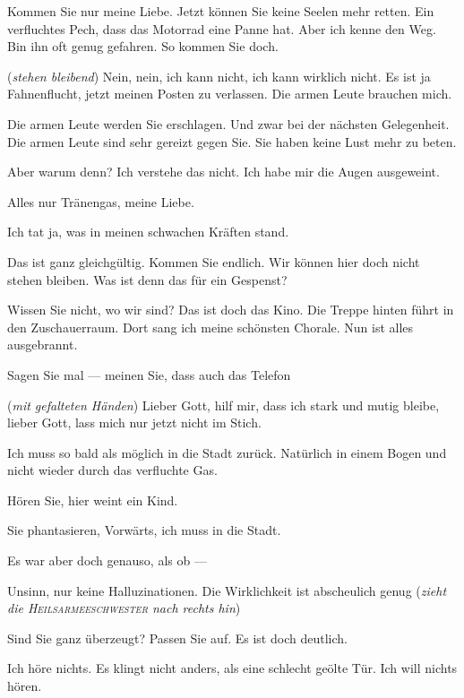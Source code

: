 \documentclass[
	final,
	a4paper,
	ngerman,
	mpinclude = true, %
	twoside = true,
	open = right,
	cleardoublepage = plain,
	DIV = 13,
	BCOR = 1cm,
	titlepage = firstiscover,
	]{scrbook}
\newcommand{\direction}[1]{(\textit{#1})}
\newcommand{\thecharacter}[1]{\textup{\textsc{#1}}\xspace}
\newcommand{\theSalwin}{\thecharacter{Salwin}}
\newcommand{\theHeilsarmeeschwester}{\thecharacter{Heilsarmeeschwester}}
\newcommand{\character}[1]{\item[#1]}
\newcommand{\Salwin}{\character{\theSalwin}}
\newcommand{\Heilsarmeeschwester}{\character{Schwester}}
\begin{document}
\begin{play}

\Salwin
Kommen Sie nur meine Liebe. Jetzt können Sie keine Seelen mehr retten. Ein verfluchtes Pech, dass das Motorrad eine Panne hat. Aber ich kenne den Weg. Bin ihn oft genug gefahren. So kommen Sie doch.

\Heilsarmeeschwester
\direction{stehen bleibend} Nein, nein, ich kann nicht, ich kann wirklich nicht. Es ist ja Fahnenflucht, jetzt meinen Posten zu verlassen. Die armen Leute brauchen mich.

\Salwin
Die armen Leute werden Sie erschlagen. Und zwar bei der nächsten Gelegenheit. Die armen Leute sind sehr gereizt gegen Sie. Sie haben keine Lust mehr zu beten.

\Heilsarmeeschwester
Aber warum denn? Ich verstehe das nicht. Ich habe mir die Augen ausgeweint.

\Salwin
Alles nur Tränengas, meine Liebe.

\Heilsarmeeschwester
Ich tat ja, was in meinen schwachen Kräften stand.

\Salwin
Das ist ganz gleichgültig. Kommen Sie endlich. Wir können hier doch nicht stehen bleiben. Was ist denn das für ein Gespenst?

\Heilsarmeeschwester
Wissen Sie nicht, wo wir sind? Das ist doch das Kino. Die Treppe hinten führt in den Zuschauerraum. Dort sang ich meine schönsten Chorale. Nun ist alles ausgebrannt.

\Salwin
Sagen Sie mal --- meinen Sie, dass auch das Telefon

\Heilsarmeeschwester
\direction{mit gefalteten Händen} Lieber Gott, hilf mir, dass ich stark und mutig bleibe, lieber Gott, lass mich nur jetzt nicht im Stich.

\Salwin
Ich muss so bald als möglich in die Stadt zurück. Natürlich in einem Bogen und nicht wieder durch das verfluchte Gas.

\Heilsarmeeschwester
Hören Sie, hier weint ein Kind.

\Salwin
Sie phantasieren, Vorwärts, ich muss in die Stadt.

\Heilsarmeeschwester
Es war aber doch genauso, als ob ---

\Salwin
Unsinn, nur keine Halluzinationen. Die Wirklichkeit ist abscheulich genug \direction{zieht die \theHeilsarmeeschwester nach rechts hin}

\Heilsarmeeschwester
Sind Sie ganz überzeugt? Passen Sie auf. Es ist doch deutlich.

\Salwin
Ich höre nichts. Es klingt nicht anders, als eine schlecht geölte Tür. Ich will nichts hören.


\end{play}
\end{document}
